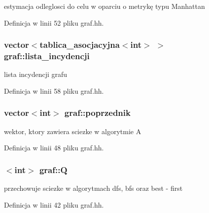 estymacja odleglosci do celu w oparciu o metrykę typu Manhattan 



Definicja w linii 52 pliku graf.\-hh.

\hypertarget{classgraf_a867b5d2b59608ad67207f4537214e006}{
\subsubsection[{lista\-\_\-incydencji}]{\setlength{\rightskip}{0pt plus 5cm}vector$<${\bf tablica\-\_\-asocjacyjna}$<$int$>$ $>$ graf\-::lista\-\_\-incydencji\hspace{0.3cm}{\ttfamily [private]}}}\label{classgraf_a867b5d2b59608ad67207f4537214e006}


lista incydencji grafu 



Definicja w linii 58 pliku graf.\-hh.

\hypertarget{classgraf_a46ea752f882ac298a838907a32466a7a}{
\subsubsection[{poprzednik}]{\setlength{\rightskip}{0pt plus 5cm}vector$<$int$>$ graf\-::poprzednik\hspace{0.3cm}{\ttfamily [private]}}}\label{classgraf_a46ea752f882ac298a838907a32466a7a}


wektor, ktory zawiera sciezke w algorytmie A 



Definicja w linii 48 pliku graf.\-hh.

\hypertarget{classgraf_a9d7d7f9781f344e37cc41ef26e0f690a}{
\subsubsection[{Q}]{$<$int$>$ graf\-::\-Q\hspace{0.3cm}{\ttfamily [private]}}}\label{classgraf_a9d7d7f9781f344e37cc41ef26e0f690a}


przechowuje sciezke w algorytmach dfs, bfs oraz best -\/ first 



Definicja w linii 42 pliku graf.\-hh.

